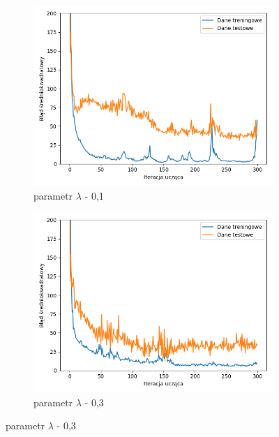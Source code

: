 \documentclass[12pt]{aghdpl}
\begin{document}
		\begin{figure}[h]
			\begin{subfigure}{.5\linewidth}
		 		\includegraphics[width =\linewidth]{wykresy/6_regularyzacja/l1/regularyzacja_0_1_wykres_uczenia.png}
		 		\caption{parametr $\lambda$ - 0,1}
		 	\end{subfigure}
		 	\begin{subfigure}{.5\linewidth}
		 		\includegraphics[width =\linewidth]{wykresy/6_regularyzacja/l1/regularyzacja_0_3_wykres_uczenia.png}
		 		\caption{parametr $\lambda$ - 0,3}
		 	\end{subfigure}
		 	

\end{figure}
\end{document}
